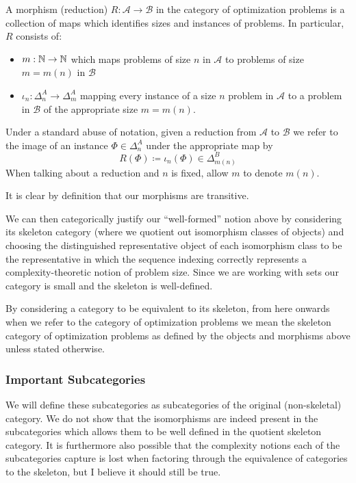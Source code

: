 \documentclass[runningheads,a4paper,english]{llncs}[2022/01/12]
\begin{document}
\begin{definition}
  A morphism (reduction) $R : \mathscr{A} \to \mathscr{B}$ in the category of optimization problems is a collection of maps which identifies sizes and instances of problems. In particular, $R$ consists of:
  \begin{itemize}
    \item $m : \mathbb{N} \to \mathbb{N}$ which maps problems of size $n$ in $\mathscr{A}$ to problems of size $m = m(n)$ in $\mathscr{B}$
    \item $\iota_n: \Delta_n^A \to \Delta_m^A$ mapping every instance of a size $n$ problem in $\mathscr{A}$ to a problem in $\mathscr{B}$ of the appropriate size $m = m(n)$.
  \end{itemize}
  Under a standard abuse of notation, given a reduction from $\mathscr{A}$ to $\mathscr{B}$ we refer to the image of an instance $\Phi \in \Delta_n^A$ under the appropriate map by 
  \[R(\Phi) \coloneq \iota_n(\Phi) \in \Delta_{m(n)}^B\]
  When talking about a reduction and $n$ is fixed, allow $m$ to denote $m(n)$.
\end{definition}
It is clear by definition that our morphisms are transitive.

We can then categorically justify our ``well-formed'' notion above by considering its skeleton category (where we quotient out isomorphism classes of objects) and choosing the distinguished representative object of each isomorphism class to be the representative in which the sequence indexing correctly represents a complexity-theoretic notion of problem size.
Since we are working with sets our category is small and the skeleton is well-defined.

By considering a category to be equivalent to its skeleton, from here onwards when we refer to the category of optimization problems we mean the skeleton category of optimization problems as defined by the objects and morphisms above unless stated otherwise.

\subsubsection{Important Subcategories}
We will define these subcategories as subcategories of the original (non-skeletal) category.
We do not show that the isomorphisms are indeed present in the subcategories which allows them to be well defined in the quotient skeleton category.
It is furthermore also possible that the complexity notions each of the subcategories capture is lost when factoring through the equivalence of categories to the skeleton, but I believe it should still be true.
\end{document}
